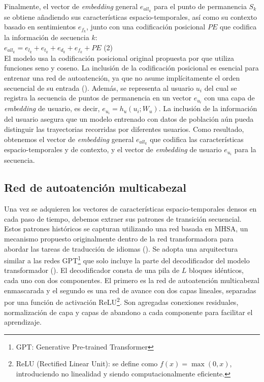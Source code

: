 Finalmente, el vector de \textit{embedding} general 
$e_{all_k}$ para el punto de permanencia $S_k$ se obtiene 
añadiendo sus características espacio-temporales, as\'i como su contexto
basado en sentimientos $e_{f_k}$, junto con una codificación posicional 
$PE$ que codifica la información de secuencia $k$:\\

\(e_{all_k}  = e_{l_k} + e_{t_k} + e_{d_k} + e_{f_k} + PE\) (2)\\

El modelo usa la codificación posicional original propuesta por 
\cite{vaswani2017attention} que utiliza funciones seno y coseno. 
La inclusión de la codificación posicional es esencial para 
entrenar una red de autoatención, ya que no asume implícitamente 
el orden secuencial de su entrada (\cite{vaswani2017attention}). Además, 
se representa al usuario $u_i$ del cual se registra la secuencia 
de puntos de permanencia en un vector $e_{u_i}$ con una 
capa de \textit{embedding} de usuario, es decir, 
$e_{u_i} = h_u(u_i; W_u)$. La inclusión de la información 
del usuario asegura que un modelo entrenado con datos de 
población aún pueda distinguir las trayectorias recorridas por 
diferentes usuarios. Como resultado, obtenemos el vector de \textit{embedding} 
general ${e}_{all_k}$ que codifica las características 
espacio-temporales y de contexto, y el vector de 
\textit{embedding} de usuario ${e}_{u_i}$ para la secuencia.


\subsection{Red de autoatención multicabezal}

Una vez se adquieren los vectores de características 
espacio-temporales densos en cada paso de tiempo, debemos extraer 
sus patrones de transición secuencial. Estos patrones históricos 
se capturan utilizando una red basada en MHSA, un mecanismo 
propuesto originalmente dentro de la red transformadora para 
abordar las tareas de traducción de idiomas (\cite{vaswani2017attention}). 
Se adopta una arquitectura similar a las redes GPT\footnote{GPT: Generative Pre-trained Transformer} que solo incluye la parte del decodificador 
del modelo transformador (\cite{radford2018improving}). El decodificador 
consta de una pila de \(L\) bloques idénticos, cada uno con dos 
componentes. El primero es la red de autoatención multicabezal enmascarada 
y el segundo es una red de avance con dos capas lineales, 
separadas por una función de activación ReLU\footnote{ReLU 
(Rectified Linear Unit): se define como 
$f(x) = \max(0, x)$, introduciendo no linealidad y siendo 
computacionalmente eficiente.}. Son agregadas
conexiones residuales, normalización de capa y capas de abandono 
a cada componente para facilitar el aprendizaje. 

